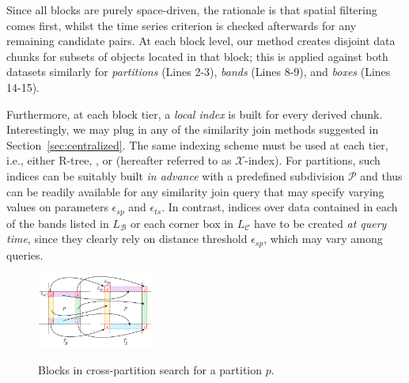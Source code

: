 Since all blocks are purely space-driven, the rationale is that spatial filtering comes first, whilst the time series criterion is checked afterwards for any remaining candidate pairs. At each block level, our method creates disjoint data chunks for subsets of objects located in that block; this is applied against both datasets similarly for {\em partitions} (Lines 2-3), {\em bands} (Lines 8-9), and {\em boxes} (Lines 14-15). 

Furthermore, at each block tier, a {\em local index} is built for every derived chunk. Interestingly, we may plug in any of the similarity join methods suggested in Section~\ref{sec:centralized}. The same indexing scheme must be used at each tier, i.e., either R-tree, \isax, or {\btsr}  (hereafter referred to as $\mathcal{X}$-index). For partitions, such indices can be suitably built {\em in advance} with a predefined subdivision $\mathcal{P}$ and thus can be readily available for any similarity join query that may specify varying values on parameters $\epsilon_{sp}$ and $\epsilon_{ts}$. In contrast, indices over data contained in each of the bands listed in $L_{\mathcal{B}}$ or each corner box in $L_{\mathcal{C}}$ have to be created {\em  at query time}, since they clearly rely on distance threshold $\epsilon_{sp}$, which may vary among queries. %

\begin{figure}[!t]
 \centering
{\includegraphics[trim=0 2mm 0 1mm, clip, width=0.34\textwidth]{figures/grid_exchange_slices.png}}
 \vspace{-10pt}
\caption{Blocks in cross-partition search for a partition $p$.}
\label{fig:blocks}
\end{figure}

\let\oldnl\nl%
\newcommand{\nonl}{\renewcommand{\nl}{\let\nl\oldnl}}%

